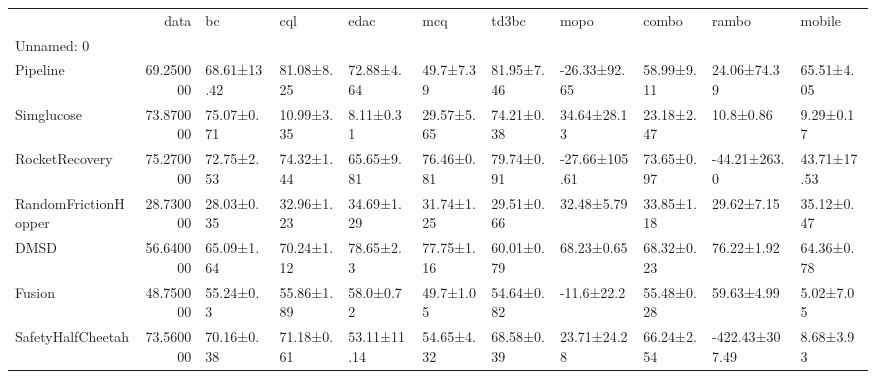 \begin{tabular}{lrlllllllll}
\toprule
 & data & bc & cql & edac & mcq & td3bc & mopo & combo & rambo & mobile \\
Unnamed: 0 &  &  &  &  &  &  &  &  &  &  \\
\midrule
Pipeline & 69.250000 & 68.61±13.42 & 81.08±8.25 & 72.88±4.64 & 49.7±7.39 & 81.95±7.46 & -26.33±92.65 & 58.99±9.11 & 24.06±74.39 & 65.51±4.05 \\
Simglucose & 73.870000 & 75.07±0.71 & 10.99±3.35 & 8.11±0.31 & 29.57±5.65 & 74.21±0.38 & 34.64±28.13 & 23.18±2.47 & 10.8±0.86 & 9.29±0.17 \\
RocketRecovery & 75.270000 & 72.75±2.53 & 74.32±1.44 & 65.65±9.81 & 76.46±0.81 & 79.74±0.91 & -27.66±105.61 & 73.65±0.97 & -44.21±263.0 & 43.71±17.53 \\
RandomFrictionHopper & 28.730000 & 28.03±0.35 & 32.96±1.23 & 34.69±1.29 & 31.74±1.25 & 29.51±0.66 & 32.48±5.79 & 33.85±1.18 & 29.62±7.15 & 35.12±0.47 \\
DMSD & 56.640000 & 65.09±1.64 & 70.24±1.12 & 78.65±2.3 & 77.75±1.16 & 60.01±0.79 & 68.23±0.65 & 68.32±0.23 & 76.22±1.92 & 64.36±0.78 \\
Fusion & 48.750000 & 55.24±0.3 & 55.86±1.89 & 58.0±0.72 & 49.7±1.05 & 54.64±0.82 & -11.6±22.2 & 55.48±0.28 & 59.63±4.99 & 5.02±7.05 \\
SafetyHalfCheetah & 73.560000 & 70.16±0.38 & 71.18±0.61 & 53.11±11.14 & 54.65±4.32 & 68.58±0.39 & 23.71±24.28 & 66.24±2.54 & -422.43±307.49 & 8.68±3.93 \\
\bottomrule
\end{tabular}

